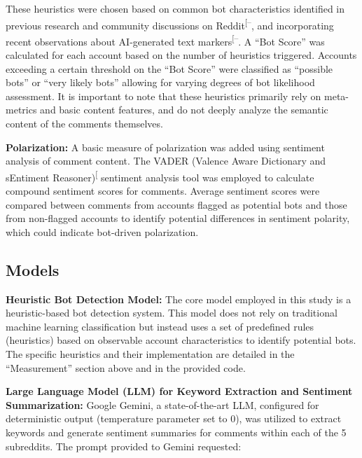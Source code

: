 \documentclass[
  12pt,
  letterpaper,
  DIV=11,
  numbers=noendperiod,
  abstract]{scrartcl}
\begin{document}
These heuristics were chosen based on common bot characteristics
identified in previous research and community discussions on
Reddit\textsuperscript{{[}--\citeproc{ref-botproblem7daystodie}{25}{]}},
and incorporating recent observations about AI-generated text
markers\textsuperscript{{[}--\citeproc{ref-nightwateremdash}{22}{]}}.
A ``Bot Score'' was calculated for each account based on the number of
heuristics triggered. Accounts exceeding a certain threshold on the
``Bot Score'' were classified as ``possible bots'' or ``very likely
bots'' allowing for varying degrees of bot likelihood assessment. It is
important to note that these heuristics primarily rely on meta-metrics
and basic content features, and do not deeply analyze the semantic
content of the comments themselves.

\textbf{Polarization:} A basic measure of polarization was added using
sentiment analysis of comment content. The VADER (Valence Aware
Dictionary and sEntiment
Reasoner)\textsuperscript{{[}\citeproc{ref-hutto2014vader}{26}{]}}
sentiment analysis tool was employed to calculate compound sentiment
scores for comments. Average sentiment scores were compared between
comments from accounts flagged as potential bots and those from
non-flagged accounts to identify potential differences in sentiment
polarity, which could indicate bot-driven polarization.

\subsection{Models}\label{models}

\textbf{Heuristic Bot Detection Model:} The core model employed in this
study is a heuristic-based bot detection system. This model does not
rely on traditional machine learning classification but instead uses a
set of predefined rules (heuristics) based on observable account
characteristics to identify potential bots. The specific heuristics and
their implementation are detailed in the ``Measurement'' section above
and in the provided code.

\textbf{Large Language Model (LLM) for Keyword Extraction and Sentiment
Summarization:} Google Gemini, a state-of-the-art LLM, configured for
deterministic output (temperature parameter set to 0), was utilized to
extract keywords and generate sentiment summaries for comments within
each of the 5 subreddits. The prompt provided to Gemini requested:
\end{document}
